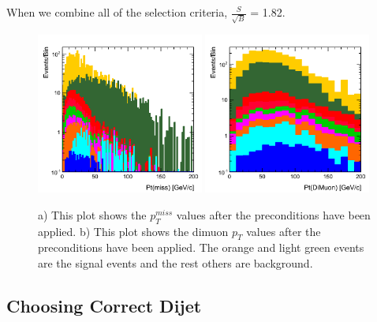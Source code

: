 \documentclass[12pt]{article}
\begin{document}
When we combine all of the selection criteria, $\frac{S}{\sqrt{B}} $ = 1.82.
\begin{figure}[!hbtp]
\begin{center}
    \includegraphics[width=0.49\textwidth]{images/Hist_PtMiss.png}
    \includegraphics[width=0.49\textwidth]{images/Hist_DiMuonPt.png}
    \caption{ \label{fig:ptmiss}
         a) This plot shows the $p^{miss}_{T}$ values after the preconditions have been applied. b) This plot shows the dimuon $p_{T}$ values 
	 after the preconditions have been applied. The orange and light green events are the signal events and the rest others are background.
      }
\end{center}
\end{figure} 


\subsection{Choosing Correct Dijet}
\end{document}
